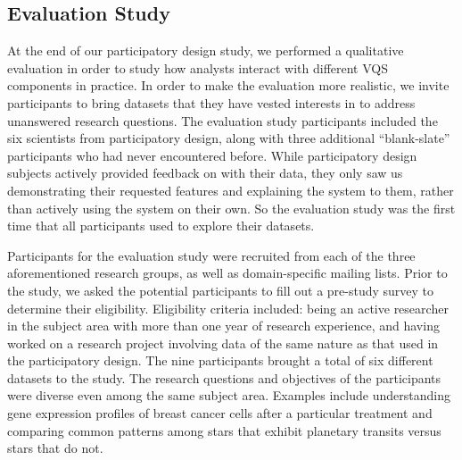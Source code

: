 \subsection{Evaluation Study}
At the end of our participatory design study, we performed a qualitative evaluation in order to study how analysts interact with different VQS components in practice. In order to make the evaluation more realistic, we invite participants to bring datasets that they have vested interests in to address unanswered research questions. The evaluation study participants included the six scientists from participatory design, along with three additional ``blank-slate'' participants who had never encountered \zv before. While participatory design subjects actively provided feedback on \zv with their data, they only saw us demonstrating their requested features and explaining the system to them, rather than actively using the system on their own. So the evaluation study was the first time that all participants used \zv to explore their datasets.
\par Participants for the evaluation study were recruited from each of the three aforementioned research groups, as well as domain-specific mailing lists. Prior to the study, we asked the potential participants to fill out a pre-study survey to determine their eligibility. Eligibility criteria included: being an active researcher in the subject area with more than one year of research experience, and having worked on a research project involving data of the same nature as that used in the participatory design. The nine participants brought a total of six different datasets to the study. The research questions and objectives of the participants were diverse even among the same subject area. Examples include understanding gene expression profiles of breast cancer cells after a particular treatment and comparing common patterns among stars that exhibit planetary transits versus stars that do not. 
